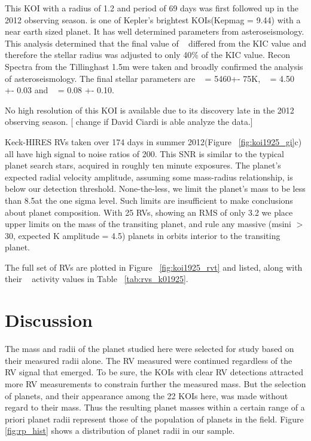 \documentclass{emulateapj}
\begin{document}
This KOI with a radius of 1.2 \rearth and period of 69 days was first followed up in the 2012 observing season. \koioneninetwofive is one of Kepler's brightest KOIs(Kepmag = 9.44) with a near earth sized planet. It has well determined parameters from asteroseismology\citep{Bruntt2012,Huber2013}. This analysis determined that the final value of \logg~ differed from the KIC value and therefore the stellar radius was adjusted to only 40\% of the KIC value.  Recon Spectra from the Tillinghast 1.5m were taken and broadly confirmed the analysis of asteroseismology. The final stellar parameters are \teff~ = 5460+- 75K, \logg~ = 4.50 +- 0.03 and \feh~ = 0.08 +- 0.10.

No high resolution of this KOI is available due to its discovery late in the 2012 observing season.  [ change if David Ciardi is able analyze the data.] %


 Keck-HIRES RVs taken over 174 days in summer 2012(Figure ~\ref{fig:koi1925_gi}c) all have high signal to noise ratios of 200. This SNR is similar to the typical planet search stars, acquired in roughly ten minute exposures.   The planet's expected radial velocity amplitude, assuming some mass-radius relationship, is below our detection threshold. None-the-less, we limit the planet's mass to be less than 8.5\mearth at the one sigma level. Such limits are insufficient to make conclusions about planet composition.  With 25 RVs, showing an RMS of only 3.2 \ms we place upper limits on the mass of the transiting planet, and rule any massive (msini $>$ 30\mearthe, expected K amplitude = 4.5\ms) planets in orbits interior to the transiting planet.

The full set of RVs are plotted in  Figure ~\ref{fig:koi1925_rvt}  and listed, along with their \rphk~ activity values in  Table ~\ref{tab:rvs_k01925}.


\section{Discussion}           %
\label{sec:discussion}

The mass and radii of the planet studied here were selected for study based on their measured radii alone.  The RV measured were continued regardless of the RV signal that emerged.   To be sure, the KOIs with clear RV detections attracted more RV measurements to constrain further the measured mass.  But the selection of planets, and their appearance among the 22 KOIs here, was made without regard to their mass.  Thus the resulting planet masses within a certain range of a priori planet radii represent those of the population of planets in the \ek field. Figure \ref{fig:rp_hist} shows a distribution of planet radii in our sample.
\end{document}
